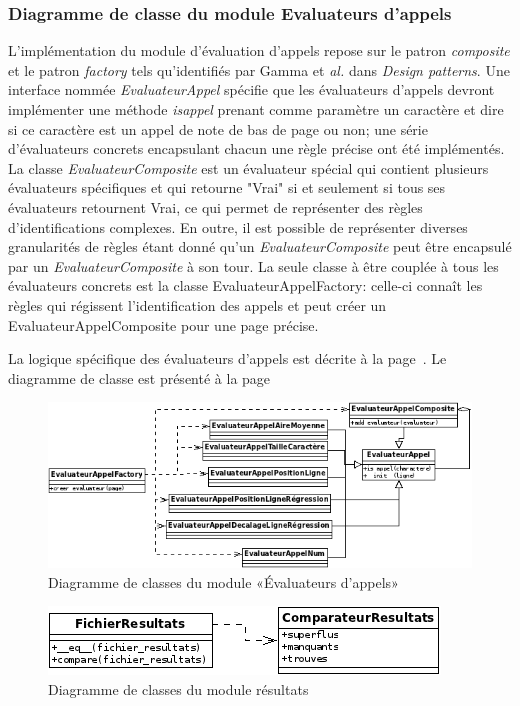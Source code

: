\subsubsection{Diagramme de classe du module Evaluateurs d'appels}
L'implémentation du module d'évaluation d'appels repose sur le patron \emph{composite} et le patron \emph{factory} tels qu'identifiés par Gamma et \emph{al.} dans \emph{Design patterns}\cite{gamma1995design}. Une interface nommée \emph{EvaluateurAppel} spécifie que les évaluateurs d'appels devront implémenter une méthode \emph{isappel} prenant comme paramètre un caractère et dire si ce caractère est un appel de note de bas de page ou non; une série d'évaluateurs concrets encapsulant chacun une règle précise ont été implémentés. La classe \emph{EvaluateurComposite} est un évaluateur spécial qui contient plusieurs évaluateurs spécifiques et qui retourne "Vrai" si et seulement si tous ses évaluateurs retournent Vrai, ce qui permet de représenter des règles d'identifications complexes. En outre, il est possible de représenter diverses granularités de règles étant donné qu'un \emph{EvaluateurComposite} peut être encapsulé par un \emph{EvaluateurComposite} à son tour. La seule classe à être couplée à tous les évaluateurs concrets est la classe EvaluateurAppelFactory: celle-ci connaît les règles qui régissent l'identification des appels et peut créer un EvaluateurAppelComposite pour une page précise.

La logique spécifique des évaluateurs d'appels est décrite à la page~\pageref{tableau-evaluateurs}. Le diagramme de classe est présenté à la page~\pageref{classesresultat}
\begin{figure}
    \centerline{\includegraphics{figures/diagramme-classe-evaluateurs.png}}
    \caption{Diagramme de classes du module «Évaluateurs d'appels»}
    \label{classesevaluateurs}
\end{figure}


\begin{figure}
    \centerline{\includegraphics{figures/diagramme-classe-resultats.png}}
    \caption{Diagramme de classes du module résultats}
    \label{classesresultat}
\end{figure}


